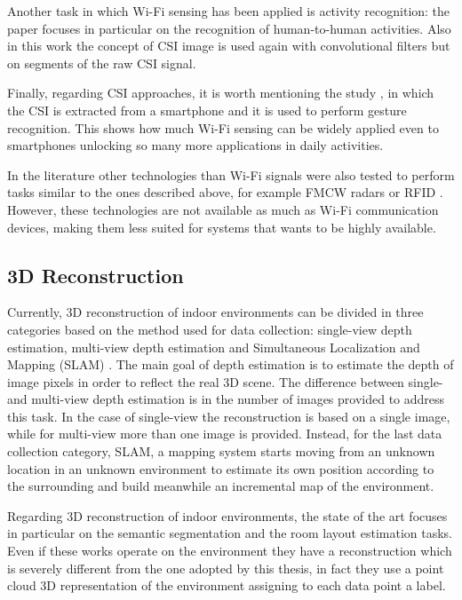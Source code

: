 \documentclass[binding=0.6cm,noexaminfo]{sapthesis}
\begin{document}
Another task in which Wi-Fi sensing has been applied is activity recognition: the paper \cite{human-to-human} focuses in particular on the recognition of human-to-human activities. Also in this work the concept of CSI image is used again with convolutional filters but on segments of the raw CSI signal.

Finally, regarding CSI approaches, it is worth mentioning the study \cite{novel-gesture-recognition}, in which the CSI is extracted from a smartphone and it is used to perform gesture recognition. This shows how much Wi-Fi sensing can be widely applied even to smartphones unlocking so many more applications in daily activities.

In the literature other technologies than Wi-Fi signals were also tested to perform tasks similar to the ones described above, for example FMCW radars \cite{human-through-wall, rf-based-3d-skeleton} or RFID \cite{rfid}. However, these technologies are not available as much as Wi-Fi communication devices, making them less suited for systems that wants to be highly available.

\subsection{3D Reconstruction}

Currently, 3D reconstruction of indoor environments can be divided in three categories based on the method used for data collection: single-view depth estimation, multi-view depth estimation and Simultaneous Localization and Mapping (SLAM) \cite{indoor-env-survey}. The main goal of depth estimation is to estimate the depth of image pixels in order to reflect the real 3D scene. The difference between single- and multi-view depth estimation is in the number of images provided to address this task. In the case of single-view the reconstruction is based on a single image, while for multi-view more than one image is provided. Instead, for the last data collection category, SLAM, a mapping system starts moving from an unknown location in an unknown environment to estimate its own position according to the surrounding and build meanwhile an incremental map of the environment.

Regarding 3D reconstruction of indoor environments, the state of the art focuses in particular on the semantic segmentation \cite{semantic-segmentation-rgbd-images, pointnet} and the room layout estimation \cite{360-mlc, psmnet} tasks. Even if these works operate on the environment they have a reconstruction which is severely different from the one adopted by this thesis, in fact they use a point cloud 3D representation of the environment assigning to each data point a label.
\end{document}
